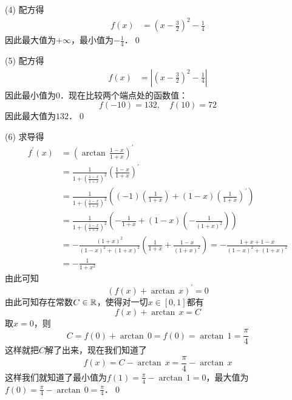 (4) \solve 配方得
\begin{align}
    f(x) &= (x - \frac{3}{2})^2 - \frac{1}{4}
\end{align}
因此最大值为$+\infty$，最小值为$-\displaystyle\frac{1}{4}$．\qed\bigskip

(5) \solve 配方得
\begin{align}
    f(x) &= \left| \left(x - \frac{3}{2}\right)^2 - \frac{1}{4} \right|
\end{align}
因此最小值为$0$．现在比较两个端点处的函数值：
\begin{equation}
    f(-10) = 132, \quad f(10) = 72
\end{equation}
因此最大值为$132$．\qed\bigskip

(6) \solve 求导得
\begin{align}
    f^{\prime}(x) &= \left(\arctan \, \displaystyle\frac{1-x}{1+x}\right)^{\prime} \\
    &= \displaystyle\frac{1}{1+\left(\displaystyle\frac{1-x}{1+x}\right)^2} \left(\displaystyle\frac{1-x}{1+x}\right)^{\prime} \\
    &= \displaystyle\frac{1}{1+\left(\displaystyle\frac{1-x}{1+x}\right)^2} \left(\left(-1\right)\left(\frac{1}{1+x}\right)+\left(1-x\right)\left(\displaystyle\frac{1}{1+x}\right)^{\prime}\right) \\
    &= \displaystyle\frac{1}{1+\left(\displaystyle\frac{1-x}{1+x}\right)^2} \left(-\displaystyle\frac{1}{1+x}+\left(1-x\right)\left(-\displaystyle\frac{1}{\left(1+x\right)^2}\right)\right) \\
    &= -\frac{\left(1+x\right)^2}{\left(1-x\right)^2+\left(1+x\right)^2} \left(\frac{1}{1+x} + \frac{1-x}{\left(1+x\right)^2}\right) = - \frac{1+x+1-x}{\left(1-x\right)^2+\left(1+x\right)^2} \\
    &= -\frac{1}{1+x^2}
\end{align}
由此可知
\begin{equation}
    \left(f(x) + \arctan \, x\right)^{\prime} = 0
\end{equation}
由此可知存在常数$C \in \mathbb{R}$，使得对一切$x \in [0,1]$都有
\begin{equation}
    f(x) + \arctan \, x = C
\end{equation}
取$x = 0$，则
\begin{equation}
    C = f(0) + \arctan \, 0 = f(0) = \arctan \, 1 = \frac{\pi}{4}
\end{equation}
这样就把$C$解了出来，现在我们知道了
\begin{equation}
    f(x) = C - \arctan \, x = \frac{\pi}{4} - \arctan \, x
\end{equation}
这样我们就知道了最小值为$f(1) = \displaystyle\frac{\pi}{4} - \arctan \, 1 = 0$，最大值为$f(0) = \displaystyle\frac{\pi}{4} - \arctan \, 0 = \displaystyle\frac{\pi}{4}$．\qed\bigskip